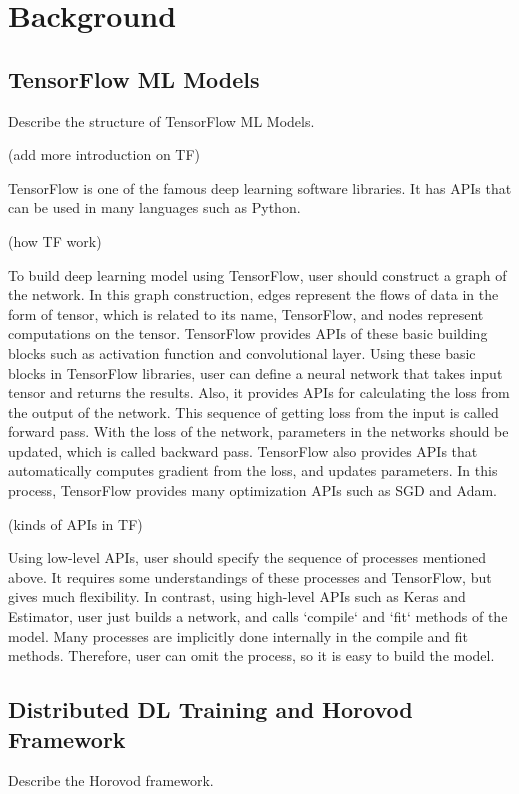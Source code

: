 \section{Background}\label{sec:background}
\subsection{TensorFlow ML Models}
Describe the structure of TensorFlow ML Models.

(add more introduction on TF)

TensorFlow is one of the famous deep learning software libraries.
It has APIs that can be used in many languages such as Python.

(how TF work\cite{doi:10.3102/1076998619872761})

To build deep learning model using TensorFlow,
user should construct a graph of the network.
In this graph construction, edges represent the flows of data in the form of tensor,
which is related to its name, TensorFlow,
and nodes represent computations on the tensor.
TensorFlow provides APIs of these basic building blocks
such as activation function and convolutional layer.
Using these basic blocks in TensorFlow libraries, user can define a neural network
that takes input tensor and returns the results.
Also, it provides APIs for calculating the loss from the output of the network.
This sequence of getting loss from the input is called forward pass.
With the loss of the network, parameters in the networks should be updated,
which is called backward pass.
TensorFlow also provides APIs that automatically computes gradient from the loss,
and updates parameters.
In this process, TensorFlow provides many optimization APIs
such as SGD and Adam.

(kinds of APIs in TF\cite{doi:10.3102/1076998619872761})

Using low-level APIs, user should specify the sequence of processes mentioned above.
It requires some understandings of these processes and TensorFlow,
but gives much flexibility.
In contrast, using high-level APIs such as Keras and Estimator,
user just builds a network, and calls `compile` and `fit` methods of the model.
Many processes are implicitly done internally in the compile and fit methods.
Therefore, user can omit the process, so it is easy to build the model.


\subsection{Distributed DL Training and Horovod Framework}
Describe the Horovod framework.


